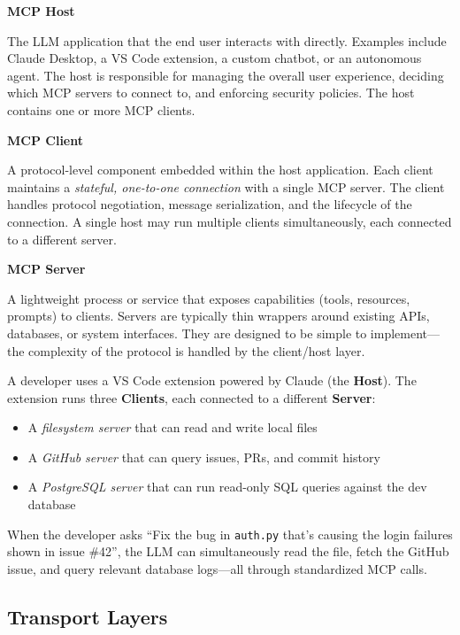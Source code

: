 \textbf{MCP Host}

The LLM application that the end user interacts with directly. Examples include Claude Desktop, a VS Code extension, a custom chatbot, or an autonomous agent. The host is responsible for managing the overall user experience, deciding which MCP servers to connect to, and enforcing security policies. The host contains one or more MCP clients.

\textbf{MCP Client}

A protocol-level component embedded within the host application. Each client maintains a \emph{stateful, one-to-one connection} with a single MCP server. The client handles protocol negotiation, message serialization, and the lifecycle of the connection. A single host may run multiple clients simultaneously, each connected to a different server.

\textbf{MCP Server}

A lightweight process or service that exposes capabilities (tools, resources, prompts) to clients. Servers are typically thin wrappers around existing APIs, databases, or system interfaces. They are designed to be simple to implement---the complexity of the protocol is handled by the client/host layer.

\begin{examplebox}
A developer uses a VS Code extension powered by Claude (the \textbf{Host}). The extension runs three \textbf{Clients}, each connected to a different \textbf{Server}:

\begin{itemize}
  \item A \emph{filesystem server} that can read and write local files
  \item A \emph{GitHub server} that can query issues, PRs, and commit history
  \item A \emph{PostgreSQL server} that can run read-only SQL queries against the dev database
\end{itemize}

When the developer asks ``Fix the bug in \texttt{auth.py} that’s causing the login failures shown in issue \#42'', the LLM can simultaneously read the file, fetch the GitHub issue, and query relevant database logs---all through standardized MCP calls.
\end{examplebox}

\subsection{Transport Layers}
\label{transport-layers}

